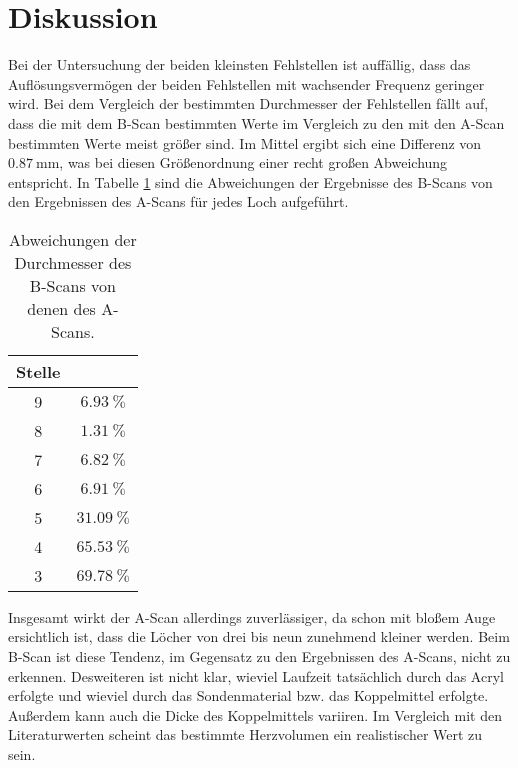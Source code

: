 \section{Diskussion}
\label{sec:Diskussion}

Bei der Untersuchung der beiden kleinsten Fehlstellen ist auffällig, dass das Auflösungsvermögen 
der beiden Fehlstellen mit wachsender Frequenz geringer wird. 
Bei dem Vergleich der bestimmten Durchmesser der Fehlstellen fällt auf, dass die mit dem 
B-Scan bestimmten Werte im Vergleich zu den mit den A-Scan bestimmten Werte meist größer sind. 
Im Mittel ergibt sich eine Differenz von $\SI{0.87}{\milli\meter}$, was bei diesen Größenordnung 
einer recht großen Abweichung entspricht. In Tabelle \ref{tab:Abw} sind die Abweichungen der Ergebnisse des
B-Scans von den Ergebnissen des A-Scans für jedes Loch aufgeführt. 

\begin{table}
\centering
\caption{Abweichungen der Durchmesser des B-Scans von denen des A-Scans.}
\label{tab:Abw}
\begin{tabular}{c c}
\toprule
Stelle & \\
\midrule 
9 & $\SI{6.93}{\percent}$\\
8 & $\SI{1.31}{\percent}$\\
7 & $\SI{6.82}{\percent}$\\
6 & $\SI{6.91}{\percent}$\\
5 & $\SI{31.09}{\percent}$\\
4 & $\SI{65.53}{\percent}$\\
3 & $\SI{69.78}{\percent}$\\
\bottomrule
\end{tabular}
\end{table}


Insgesamt wirkt der A-Scan allerdings zuverlässiger, da schon mit bloßem Auge ersichtlich ist, 
dass die Löcher von drei bis neun zunehmend kleiner werden. Beim B-Scan ist diese Tendenz, 
im Gegensatz zu den Ergebnissen des A-Scans, nicht zu erkennen. 
Desweiteren ist nicht klar, wieviel Laufzeit tatsächlich durch das Acryl erfolgte und wieviel durch 
das Sondenmaterial bzw. das Koppelmittel erfolgte. Außerdem kann auch die Dicke des Koppelmittels 
variiren. 
Im Vergleich mit den Literaturwerten scheint das bestimmte Herzvolumen ein realistischer Wert zu sein. 
